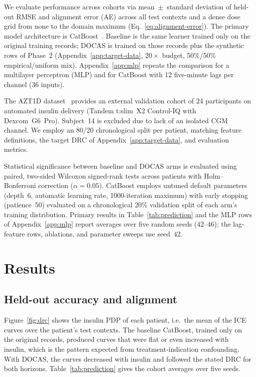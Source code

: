 \documentclass[a4paper,fleqn]{cas-sc}
\begin{document}
We evaluate performance across cohorts via mean~$\pm$~standard deviation of
held-out RMSE and alignment error (AE) across all test contexts and a dense
dose grid from none to the domain maximum (Eq.~\ref{eq:alignment-error}). The primary
model architecture is CatBoost~\citep{prokhorenkova2018}. Baseline is the same
learner trained only on the original training records; DOCAS is trained on those
records plus the synthetic rows of Phase~2 (Appendix~\ref{app:target-data},
$20\times$ budget, 50\%/50\% empirical/uniform mix). Appendix~\ref{app:mlp} repeats the comparison for a multilayer
perceptron (MLP) and for CatBoost with 12 five-minute lags per channel (36 inputs).

The AZT1D dataset~\citep{khamesian2025azt1d,khamesian2025azt1ddata} provides an
external validation cohort of 24 participants on automated insulin delivery (Tandem
t:slim~X2 Control-IQ with Dexcom~G6~Pro). Subject~14 is excluded due to lack of an
isolated CGM channel. We employ an 80/20 chronological
split per patient, matching feature definitions, the target DRC of
Appendix~\ref{app:target-data}, and evaluation metrics.

Statistical significance between baseline and DOCAS arms is evaluated using paired,
two-sided Wilcoxon signed-rank tests across patients with Holm--Bonferroni correction
($\alpha{=}0.05$). CatBoost employs untuned default parameters (depth~6, automatic
learning rate, 1000-iteration maximum) with early stopping (patience~50) evaluated
on a chronological 20\% validation split of each arm's training distribution. Primary
results in Table~\ref{tab:prediction} and the MLP rows of Appendix~\ref{app:mlp} report averages over
five random seeds ($42$--$46$); the lag-feature rows, ablations, and parameter sweeps use seed~$42$.

\section{Results}\label{sec:results}

\subsection{Held-out accuracy and alignment}\label{subsec:ohio-results}

Figure~\ref{fig:drc} shows the insulin PDP of each patient, i.e.\ the mean of
the ICE curves over the patient's test contexts. The baseline CatBoost, trained
only on the original records, produced curves that were flat or even increased
with insulin, which is the pattern expected from treatment-indication
confounding. With DOCAS, the curves decreased with insulin and followed the
stated DRC for both horizons. Table~\ref{tab:prediction} gives the cohort
averages over five seeds.
\end{document}
